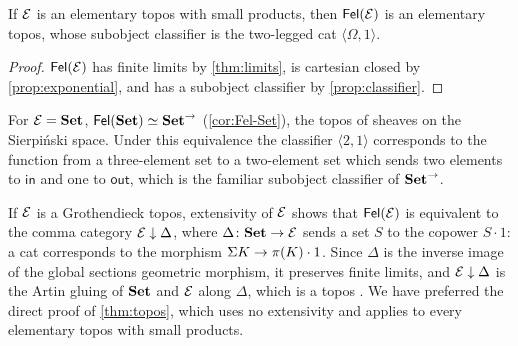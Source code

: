 \begin{theorem}\label{thm:topos}
If $\mathcal{E}$ is an elementary topos with small products, then $\mathsf{Fel}(\mathcal{E})$ is an
elementary topos, whose subobject classifier is the two-legged cat
$\langle\Omega,1\rangle$.
\end{theorem}

\begin{proof}
$\mathsf{Fel}(\mathcal{E})$ has finite limits by \cref{thm:limits}, is cartesian closed by
\cref{prop:exponential}, and has a subobject classifier by
\cref{prop:classifier}.
\end{proof}

\begin{example}\label{ex:sierpinski}
For $\mathcal{E}=\mathbf{Set}$, $\mathsf{Fel}(\mathbf{Set})\simeq\mathbf{Set}^{\to}$ (\cref{cor:Fel-Set}), the topos of
sheaves on the Sierpi\'nski space. Under this equivalence the classifier
$\langle2,1\rangle$ corresponds to the function from a three-element set to a
two-element set which sends two elements to $\mathsf{in}$ and one to
$\mathsf{out}$, which is the familiar subobject classifier of $\mathbf{Set}^{\to}$.
\end{example}

\begin{remark}\label{rem:gluing}
If $\mathcal{E}$ is a Grothendieck topos, extensivity of $\mathcal{E}$ shows that $\mathsf{Fel}(\mathcal{E})$ is
equivalent to the comma category $\mathcal{E}\downarrow\Delta$, where
$\Delta\colon\mathbf{Set}\to\mathcal{E}$ sends a set $S$ to the copower $S\cdot1$: a cat
corresponds to the morphism $\Sigma K\to\pi(K)\cdot1$. Since $\Delta$ is the
inverse image of the global sections geometric morphism, it preserves finite
limits, and $\mathcal{E}\downarrow\Delta$ is the Artin gluing of $\mathbf{Set}$ and $\mathcal{E}$ along
$\Delta$, which is a topos \cite{Johnstone2002}. We have preferred the direct
proof of \cref{thm:topos}, which uses no extensivity and applies to every
elementary topos with small products.
\end{remark}
